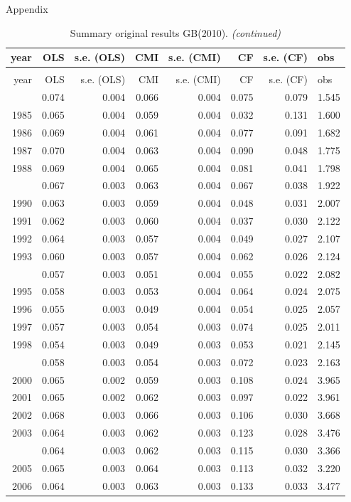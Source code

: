 \documentclass[10pt,ignorenonframetext,]{beamer}
\begin{document}
\begin{frame}[allowframebreaks]{Appendix}
\protect\hypertarget{appendix}{}

\begingroup\fontsize{7}{9}\selectfont

\begin{longtable}[t]{rrrrrrrl}
\caption{\label{tab:unnamed-chunk-6}Summary original results GB(2010).}\\
\toprule
year & OLS & s.e. (OLS) & CMI & s.e. (CMI) & CF & s.e. (CF) & obs\\
\midrule
\endfirsthead
\caption[]{Summary original results GB(2010). \textit{(continued)}}\\
\toprule
year & OLS & s.e. (OLS) & CMI & s.e. (CMI) & CF & s.e. (CF) & obs\\
\midrule
\endhead
\
\endfoot
\bottomrule
\endlastfoot
1984 & 0.074 & 0.004 & 0.066 & 0.004 & 0.075 & 0.079 & 1.545\\
1985 & 0.065 & 0.004 & 0.059 & 0.004 & 0.032 & 0.131 & 1.600\\
1986 & 0.069 & 0.004 & 0.061 & 0.004 & 0.077 & 0.091 & 1.682\\
1987 & 0.070 & 0.004 & 0.063 & 0.004 & 0.090 & 0.048 & 1.775\\
1988 & 0.069 & 0.004 & 0.065 & 0.004 & 0.081 & 0.041 & 1.798\\
\addlinespace
1989 & 0.067 & 0.003 & 0.063 & 0.004 & 0.067 & 0.038 & 1.922\\
1990 & 0.063 & 0.003 & 0.059 & 0.004 & 0.048 & 0.031 & 2.007\\
1991 & 0.062 & 0.003 & 0.060 & 0.004 & 0.037 & 0.030 & 2.122\\
1992 & 0.064 & 0.003 & 0.057 & 0.004 & 0.049 & 0.027 & 2.107\\
1993 & 0.060 & 0.003 & 0.057 & 0.004 & 0.062 & 0.026 & 2.124\\
\addlinespace
1994 & 0.057 & 0.003 & 0.051 & 0.004 & 0.055 & 0.022 & 2.082\\
1995 & 0.058 & 0.003 & 0.053 & 0.004 & 0.064 & 0.024 & 2.075\\
1996 & 0.055 & 0.003 & 0.049 & 0.004 & 0.054 & 0.025 & 2.057\\
1997 & 0.057 & 0.003 & 0.054 & 0.003 & 0.074 & 0.025 & 2.011\\
1998 & 0.054 & 0.003 & 0.049 & 0.003 & 0.053 & 0.021 & 2.145\\
\addlinespace
1999 & 0.058 & 0.003 & 0.054 & 0.003 & 0.072 & 0.023 & 2.163\\
2000 & 0.065 & 0.002 & 0.059 & 0.003 & 0.108 & 0.024 & 3.965\\
2001 & 0.065 & 0.002 & 0.062 & 0.003 & 0.097 & 0.022 & 3.961\\
2002 & 0.068 & 0.003 & 0.066 & 0.003 & 0.106 & 0.030 & 3.668\\
2003 & 0.064 & 0.003 & 0.062 & 0.003 & 0.123 & 0.028 & 3.476\\
\addlinespace
2004 & 0.064 & 0.003 & 0.062 & 0.003 & 0.115 & 0.030 & 3.366\\
2005 & 0.065 & 0.003 & 0.064 & 0.003 & 0.113 & 0.032 & 3.220\\
2006 & 0.064 & 0.003 & 0.063 & 0.003 & 0.133 & 0.033 & 3.477\\*
\end{longtable}\endgroup{}


\end{frame}
\end{document}
